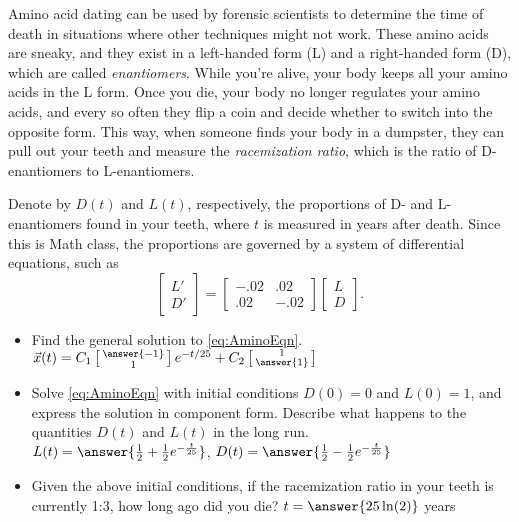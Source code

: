 \documentclass{ximera}
\begin{document}
\begin{exercise}
    Amino acid dating can be used by forensic scientists to determine the time of death in situations where other techniques might not work. These amino acids are sneaky, and they exist in a left-handed form (L) and a right-handed form (D), which are called {\it enantiomers}. While you’re alive, your body keeps all your amino acids in the L form. Once you die, your body no longer regulates your amino acids, and every so often they flip a coin and decide whether to switch into the opposite form. This way, when someone finds your body in a dumpster, they can pull out your teeth and measure the {\it racemization ratio}, which is the ratio of D-enantiomers to L-enantiomers. %

    Denote by $D(t)$ and $L(t)$, respectively, the proportions of D- and L-enantiomers found in your teeth, where $t$ is measured in years after death. Since this is Math class, the proportions are governed by a system of differential equations, such as
    \begin{equation}
        \begin{bmatrix} 
            L' \\ 
            D' 
        \end{bmatrix} 
        = 
        \begin{bmatrix} 
            -.02& .02\\ 
            .02 & -.02 
        \end{bmatrix}
        \begin{bmatrix} 
            L\\ 
            D 
        \end{bmatrix}.\label{eq:AminoEqn}
    \end{equation}
    \begin{itemize}
        \item Find the general solution to \eqref{eq:AminoEqn}.\\
            $\vec{x}(t) = C_1 \left[\begin{smallmatrix} \answer{-1} \\ 1 \end{smallmatrix}\right]e^{-t/25} + C_2\left[\begin{smallmatrix} 1 \\ \answer{1} \end{smallmatrix}\right]$
        \item Solve \eqref{eq:AminoEqn} with initial conditions $D(0) = 0$ and $L(0) = 1$, and express the solution in component form. Describe what happens to the quantities $D(t)$ and $L(t)$ in the long run.\\
            $L(t) = \answer{\frac{1}{2} + \frac{1}{2}e^{-\frac{t}{25}}}$, $D(t) = \answer{\frac{1}{2} - \frac{1}{2}e^{-\frac{t}{25}}}$
        \item Given the above initial conditions, if the racemization ratio in your teeth is currently 1:3, how long ago did you die?  $t = \answer{25\ln(2)}$  years
    \end{itemize}
\end{exercise}
\end{document}
